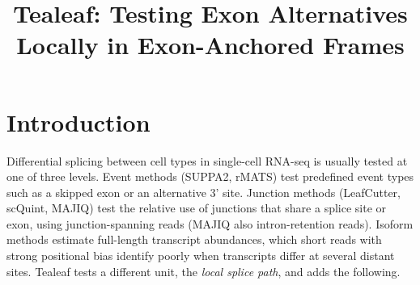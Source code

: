 \documentclass[11pt]{article}
\title{Tealeaf: Testing Exon Alternatives Locally in Exon-Anchored Frames}
\author{}
\date{}
\begin{document}
\maketitle

\section{Introduction}

Differential splicing between cell types in single-cell RNA-seq is usually tested at one of three levels. Event methods (SUPPA2, rMATS) test predefined event types such as a skipped exon or an alternative 3' site. Junction methods (LeafCutter, scQuint, MAJIQ) test the relative use of junctions that share a splice site or exon, using junction-spanning reads (MAJIQ also intron-retention reads). Isoform methods estimate full-length transcript abundances, which short reads with strong positional bias identify poorly when transcripts differ at several distant sites. Tealeaf tests a different unit, the \emph{local splice path}, and adds the following.
\end{document}
